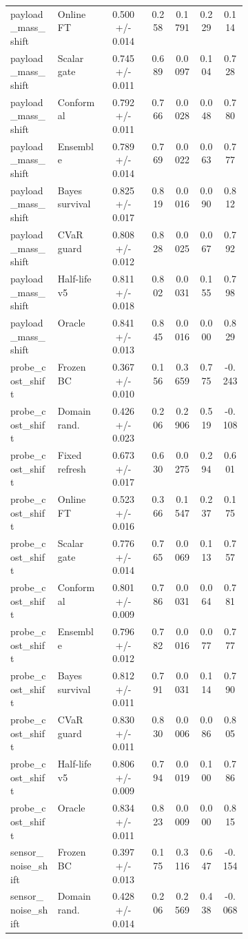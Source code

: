 \documentclass{article}
\begin{document}
\begin{center}
\begin{longtable}{p{0.20\linewidth}p{0.20\linewidth}ccccc}
payload\_mass\_shift & Online FT & 0.500 +/- 0.014 & 0.258 & 0.1791 & 0.229 & 0.114\\
payload\_mass\_shift & Scalar gate & 0.745 +/- 0.011 & 0.689 & 0.0097 & 0.104 & 0.728\\
payload\_mass\_shift & Conformal & 0.792 +/- 0.011 & 0.766 & 0.0028 & 0.048 & 0.780\\
payload\_mass\_shift & Ensemble & 0.789 +/- 0.014 & 0.769 & 0.0022 & 0.063 & 0.777\\
payload\_mass\_shift & Bayes survival & 0.825 +/- 0.017 & 0.819 & 0.0016 & 0.090 & 0.812\\
payload\_mass\_shift & CVaR guard & 0.808 +/- 0.012 & 0.828 & 0.0025 & 0.067 & 0.792\\
payload\_mass\_shift & Half-life v5 & 0.811 +/- 0.018 & 0.802 & 0.0031 & 0.155 & 0.798\\
payload\_mass\_shift & Oracle & 0.841 +/- 0.013 & 0.845 & 0.0016 & 0.000 & 0.829\\
probe\_cost\_shift & Frozen BC & 0.367 +/- 0.010 & 0.156 & 0.3659 & 0.775 & -0.243\\
probe\_cost\_shift & Domain rand. & 0.426 +/- 0.023 & 0.206 & 0.2906 & 0.519 & -0.108\\
probe\_cost\_shift & Fixed refresh & 0.673 +/- 0.017 & 0.630 & 0.0275 & 0.294 & 0.601\\
probe\_cost\_shift & Online FT & 0.523 +/- 0.016 & 0.366 & 0.1547 & 0.237 & 0.175\\
probe\_cost\_shift & Scalar gate & 0.776 +/- 0.014 & 0.765 & 0.0069 & 0.113 & 0.757\\
probe\_cost\_shift & Conformal & 0.801 +/- 0.009 & 0.786 & 0.0031 & 0.064 & 0.781\\
probe\_cost\_shift & Ensemble & 0.796 +/- 0.012 & 0.782 & 0.0016 & 0.077 & 0.777\\
probe\_cost\_shift & Bayes survival & 0.812 +/- 0.011 & 0.791 & 0.0031 & 0.114 & 0.790\\
probe\_cost\_shift & CVaR guard & 0.830 +/- 0.011 & 0.830 & 0.0006 & 0.086 & 0.805\\
probe\_cost\_shift & Half-life v5 & 0.806 +/- 0.009 & 0.794 & 0.0019 & 0.100 & 0.786\\
probe\_cost\_shift & Oracle & 0.834 +/- 0.011 & 0.823 & 0.0009 & 0.000 & 0.815\\
sensor\_noise\_shift & Frozen BC & 0.397 +/- 0.013 & 0.175 & 0.3116 & 0.647 & -0.154\\
sensor\_noise\_shift & Domain rand. & 0.428 +/- 0.014 & 0.206 & 0.2569 & 0.438 & -0.068\\

\end{longtable}
\end{center}
\end{document}
